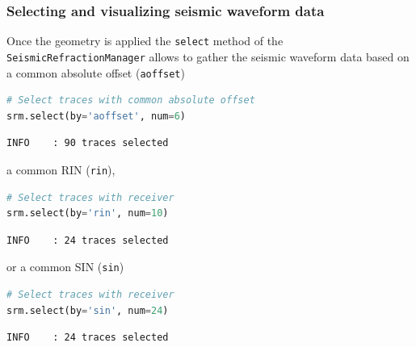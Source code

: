 \documentclass[a4paper,fleqn]{cas-sc}
\begin{document}
\subsubsection{Selecting and visualizing seismic waveform data}
Once the geometry is applied the \texttt{select} method of the \texttt{SeismicRefractionManager} allows to gather the seismic waveform data based on a common absolute offset (\texttt{aoffset})
\begin{lstlisting}[language=Python, firstnumber=6]
# Select traces with common absolute offset
srm.select(by='aoffset', num=6)
\end{lstlisting}
\begin{footnotesize}
\begin{verbatim}
INFO    : 90 traces selected
\end{verbatim}
\end{footnotesize}
a common RIN (\texttt{rin}),
\begin{lstlisting}[language=Python, firstnumber=8]
# Select traces with receiver
srm.select(by='rin', num=10)
\end{lstlisting}
\begin{footnotesize}
\begin{verbatim}
INFO    : 24 traces selected
\end{verbatim}
\end{footnotesize}
or a common SIN (\texttt{sin})
\begin{lstlisting}[language=Python, firstnumber=10]
# Select traces with receiver
srm.select(by='sin', num=24)
\end{lstlisting}
\begin{footnotesize}
\begin{verbatim}
INFO    : 24 traces selected
\end{verbatim}
\end{footnotesize}
\end{document}

